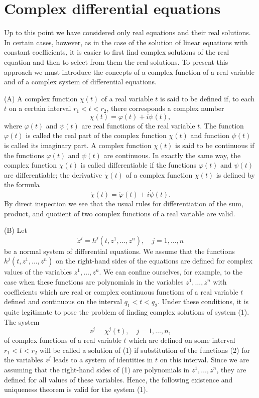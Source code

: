 \documentclass[10pt,a5paper]{book}
\theoremstyle{plain}
\theoremstyle{definition}
\theoremstyle{remark}
\begin{document}
\section{Complex differential equations}
Up to this point we have considered only real equations and their real solutions. In certain cases, however, as in the case of the solution of linear equations with constant coefficients, it is easier to first find complex solutions of the real equation and then to select from them the real solutions. To present this approach we must introduce the concepts of a complex function of a real variable and of a complex system of differential equations.

(A) A complex function $\chi(t)$ of a real variable $t$ is said to be defined if, to each $t$ on a certain interval $r_{1}<t<r_{2}$, there corresponds a complex number
\[
\chi(t)=\varphi(t)+i \psi(t),
\]
where $\varphi(t)$ and $\psi(t)$ are real functions of the real variable $t$. The function $\varphi(t)$ is called the real part of the complex function $\chi(t)$ and function $\psi(t)$ is called its imaginary part. A complex function $\chi(t)$ is said to be continuous if the functions $\varphi(t)$ and $\psi(t)$ are continuous. In exactly the same way, the complex function $\chi(t)$ is called differentiable if the functions $\varphi(t)$ and $\psi(t)$ are differentiable; the derivative $\dot{\chi}(t)$ of a complex function $\chi(t)$ is defined by the formula
\[
\dot{\chi}(t)=\dot{\varphi}(t)+i \dot{\psi}(t) .
\]
By direct inspection we see that the usual rules for differentiation of the sum, product, and quotient of two complex functions of a real variable are valid.

(B) Let
\begin{equation*}
\dot{z}^{j}=h^{j}\left(t, z^{1}, \ldots, z^{n}\right), \quad j=1, \ldots, n \tag{1}
\end{equation*}
be a normal system of differential equations. We assume that the functions $h^{j}\left(t, z^{1}, \ldots, z^{n}\right)$ on the right-hand sides of the equations are defined for
complex values of the variables $z^{1}, \ldots, z^{n}$. We can confine ourselves, for example, to the case when these functions are polynomials in the variables $z^{1}, \ldots, z^{n}$ with coefficients which are real or complex continuous functions of a real variable $t$ defined and continuous on the interval $q_{1}<t<q_{2}$. Under these conditions, it is quite legitimate to pose the problem of finding complex solutions of system (1). The system
\begin{equation*}
z^{j}=\chi^{j}(t), \quad j=1, \ldots, n, \tag{2}
\end{equation*}
of complex functions of a real variable $t$ which are defined on some interval $r_{1}<t<r_{2}$ will be called a solution of (1) if substitution of the functions (2) for the variables $z^{j}$ leads to a system of identities in $t$ on this interval. Since we are assuming that the right-hand sides of (1) are polynomials in $z^{1}, \ldots, z^{n}$, they are defined for all values of these variables. Hence, the following existence and uniqueness theorem is valid for the system (1).
\end{document}
